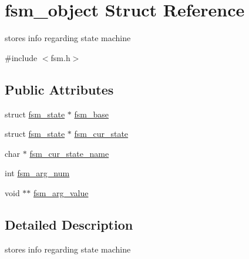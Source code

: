\hypertarget{structfsm__object}{
\section{fsm\_\-object Struct Reference}
\label{structfsm__object}
}


stores info regarding state machine  


{\ttfamily \#include $<$fsm.h$>$}\subsection*{Public Attributes}
\begin{DoxyCompactItemize}
\item 
struct \hyperlink{structfsm__state}{fsm\_\-state} $\ast$ \hyperlink{structfsm__object_ad7a2507fbf7b66a8833e29eed8fb1184}{fsm\_\-base}
\item 
struct \hyperlink{structfsm__state}{fsm\_\-state} $\ast$ \hyperlink{structfsm__object_ad5eb19f825d8f434149e720ad6d0fa4a}{fsm\_\-cur\_\-state}
\item 
char $\ast$ \hyperlink{structfsm__object_aec65222e985afecb031f8d04646f8d6d}{fsm\_\-cur\_\-state\_\-name}
\item 
int \hyperlink{structfsm__object_a1e132e0f019f722123f4aff947352cca}{fsm\_\-arg\_\-num}
\item 
void $\ast$$\ast$ \hyperlink{structfsm__object_a9de2beefef0bfeb09802fa390187dd06}{fsm\_\-arg\_\-value}
\end{DoxyCompactItemize}


\subsection{Detailed Description}
stores info regarding state machine 

